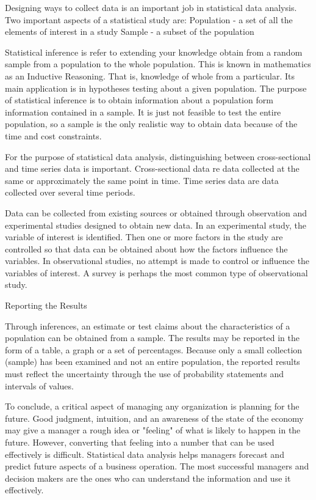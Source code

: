 Designing ways to collect data is an important job in statistical data analysis. Two important aspects of a statistical study are: 
Population - a set of all the elements of interest in a study 
Sample - a subset of the population 

Statistical inference is refer to extending your knowledge obtain from a random sample from a population to the whole population. This is known in mathematics as an Inductive Reasoning. That is, knowledge of whole from a particular. Its main application is in hypotheses testing about a given population. 
The purpose of statistical inference is to obtain information about a population form information contained in a sample. It is just not feasible to test the entire population, so a sample is the only realistic way to obtain data because of the time and cost constraints. 

For the purpose of statistical data analysis, distinguishing between cross-sectional and time series data is important. Cross-sectional data re data collected at the same or approximately the same point in time. Time series data are data collected over several time periods.

Data can be collected from existing sources or obtained through observation and experimental studies designed to obtain new data. In an experimental study, the variable of interest is identified. Then one or more factors in the study are controlled so that data can be obtained about how the factors influence the variables. In observational studies, no attempt is made to control or influence the variables of interest. A survey is perhaps the most common type of observational study.



Reporting the Results

Through inferences, an estimate or test claims about the characteristics of a population can be obtained from a sample. The results may be reported in the form of a table, a graph or a set of percentages. Because only a small collection (sample) has been examined and not an entire population, the reported results must reflect the uncertainty through the use of probability statements and intervals of values.

To conclude, a critical aspect of managing any organization is planning for the future. Good judgment, intuition, and an awareness of the state of the economy may give a manager a rough idea or "feeling" of what is likely to happen in the future. However, converting that feeling into a number that can be used effectively is difficult. Statistical data analysis helps managers forecast and predict future aspects of a business operation. The most successful managers and decision makers are the ones who can understand the information and use it effectively.

